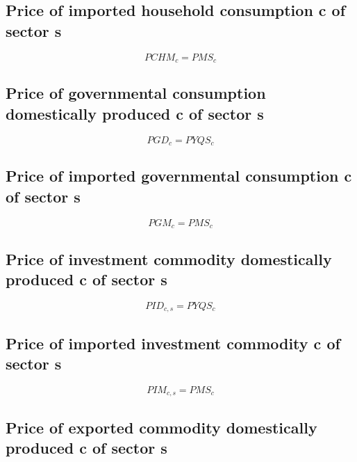 \documentclass[12pt]{article}
\numberwithin{equation}{section}
\begin{document}
\subsection{Price of imported household consumption c of sector s}


\begin{dmath}
PCHM_{c} = PMS_{c}
\end{dmath}



\subsection{Price of governmental consumption domestically produced c of sector s}


\begin{dmath}
PGD_{c} = PYQS_{c}
\end{dmath}



\subsection{Price of imported governmental consumption c of sector s}


\begin{dmath}
PGM_{c} = PMS_{c}
\end{dmath}



\subsection{Price of investment commodity domestically produced c of sector s}


\begin{dmath}
PID_{c, s} = PYQS_{c}
\end{dmath}



\subsection{Price of imported investment commodity c of sector s}


\begin{dmath}
PIM_{c, s} = PMS_{c}
\end{dmath}



\subsection{Price of exported commodity domestically produced c of sector s}
\end{document}
